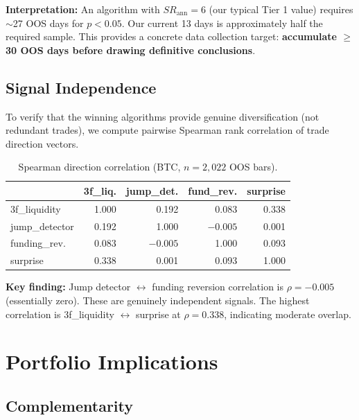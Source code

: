\documentclass[11pt,a4paper]{article}
\newcommand{\toprule}{\hline\hline}
\newcommand{\midrule}{\hline}
\newcommand{\bottomrule}{\hline\hline}
\begin{document}
\textbf{Interpretation:} An algorithm with $SR_{\text{ann}} = 6$ (our typical Tier 1 value) requires $\sim$27 OOS days for $p < 0.05$. Our current 13 days is approximately half the required sample. This provides a concrete data collection target: \textbf{accumulate $\geq$30 OOS days before drawing definitive conclusions}.

\subsection{Signal Independence}

To verify that the winning algorithms provide genuine diversification (not redundant trades), we compute pairwise Spearman rank correlation of trade direction vectors.

\begin{table}[h!]
\centering
\caption{Spearman direction correlation (BTC, $n = 2{,}022$ OOS bars).}
\label{tab:corr}
\begin{tabular}{@{}lrrrr@{}}
\toprule
 & 3f\_liq. & jump\_det. & fund\_rev. & surprise \\
\midrule
3f\_liquidity & 1.000 & 0.192 & 0.083 & 0.338 \\
jump\_detector & 0.192 & 1.000 & $-0.005$ & 0.001 \\
funding\_rev. & 0.083 & $-0.005$ & 1.000 & 0.093 \\
surprise & 0.338 & 0.001 & 0.093 & 1.000 \\
\bottomrule
\end{tabular}
\end{table}

\textbf{Key finding:} Jump detector $\leftrightarrow$ funding reversion correlation is $\rho = -0.005$ (essentially zero). These are genuinely independent signals. The highest correlation is 3f\_liquidity $\leftrightarrow$ surprise at $\rho = 0.338$, indicating moderate overlap.

\section{Portfolio Implications}

\subsection{Complementarity}
\end{document}
